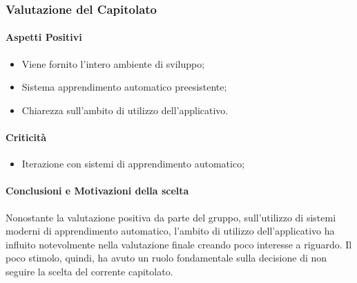 \subsubsection{Valutazione del Capitolato}

\paragraph{Aspetti Positivi}
\begin{itemize}
	\item Viene fornito l'intero ambiente di sviluppo;
	\item Sistema apprendimento automatico preesistente;
	\item Chiarezza sull'ambito di utilizzo dell'applicativo.
\end{itemize}

\paragraph{Criticità}
\begin{itemize}
	\item Iterazione con sistemi di apprendimento automatico;
\end{itemize}

\paragraph{Conclusioni e Motivazioni della scelta}
Nonostante la valutazione positiva da parte del gruppo, sull'utilizzo di sistemi moderni di apprendimento automatico, l'ambito di utilizzo dell'applicativo ha influito notevolmente nella valutazione finale creando poco interesse a riguardo.
Il poco stimolo, quindi, ha avuto un ruolo fondamentale sulla decisione di non seguire la scelta del corrente capitolato.